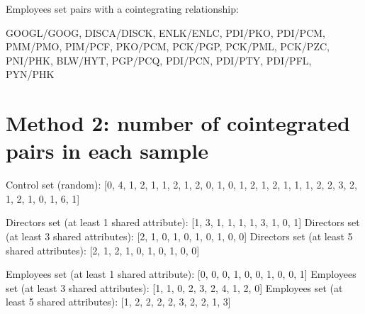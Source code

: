 \documentclass{UoYCSproject}
\begin{document}
{Employees set pairs with a cointegrating relationship:

GOOGL/GOOG, DISCA/DISCK, ENLK/ENLC, PDI/PKO, PDI/PCM, PMM/PMO, PIM/PCF, PKO/PCM, PCK/PGP, PCK/PML, PCK/PZC, PNI/PHK, BLW/HYT, PGP/PCQ, PDI/PCN, PDI/PTY, PDI/PFL, PYN/PHK}

\chapter{Method 2: number of cointegrated pairs in each sample}
{\setlength{\parindent}{0cm}
Control set (random): [0, 4, 1, 2, 1, 1, 2, 1, 2, 0, 1, 0, 1, 2, 1, 2, 1, 1, 1, 2, 2, 3, 2, 1, 2, 1, 0, 1, 6, 1]

Directors set (at least 1 shared attribute): [1, 3, 1, 1, 1, 1, 3, 1, 0, 1]
Directors set (at least 3 shared attributes): [2, 1, 0, 1, 0, 1, 0, 1, 0, 0]
Directors set (at least 5 shared attributes): [2, 1, 2, 1, 0, 1, 0, 1, 0, 0]

Employees set (at least 1 shared attribute): [0, 0, 0, 1, 0, 0, 1, 0, 0, 1]
Employees set (at least 3 shared attributes): [1, 1, 0, 2, 3, 2, 4, 1, 2, 0]
Employees set (at least 5 shared attributes): [1, 2, 2, 2, 2, 3, 2, 2, 1, 3]}

\printbibliography
\end{document}
